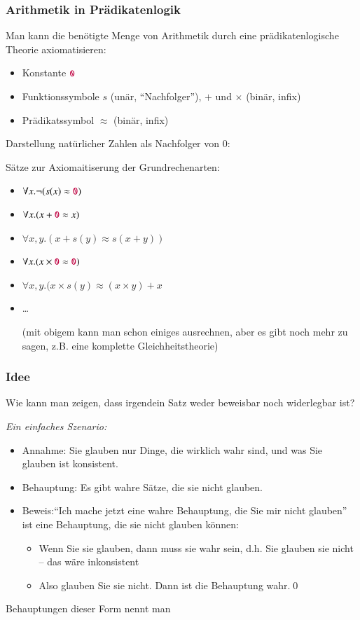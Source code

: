 \documentclass[onlymath]{beamer}
\begin{document}
\begin{frame}\frametitle{Arithmetik in Prädikatenlogik}

Man kann die benötigte Menge von Arithmetik durch eine prädikatenlogische Theorie axiomatisieren:
\begin{itemize}
\item Konstante $\mathtt{\textcolor{purple}{0}}$
\item Funktionssymbole $s$ (unär, "`Nachfolger"'), $+$ und $\times$ (binär, infix)
\item Prädikatssymbol $\approx$ (binär, infix)
\end{itemize}

Darstellung natürlicher Zahlen als Nachfolger von 0:\\[0.5ex]
\bigskip

Sätze zur Axiomaitiserung der Grundrechenarten:
\begin{itemize}
\item $\forall x.\neg(s(x)\approx \mathtt{\textcolor{purple}{0}})$
\item $\forall x.(x+\mathtt{\textcolor{purple}{0}}\approx x)$ 
\item $\forall x,y.(x+s(y)\approx s(x+y))$
\item $\forall x.(x\times \mathtt{\textcolor{purple}{0}}\approx \mathtt{\textcolor{purple}{0}})$ 
\item $\forall x,y.(x\times s(y)\approx (x\times y)+x$
\item \ldots {\tiny (mit obigem kann man schon einiges ausrechnen, aber es gibt noch mehr zu sagen, z.B. eine komplette Gleichheitstheorie)

}
\end{itemize}

\end{frame}


\begin{frame}\frametitle{Idee}

Wie kann man zeigen, dass irgendein Satz weder beweisbar noch widerlegbar ist?
\bigskip\pause

\emph{Ein einfaches Szenario:}
\begin{itemize}
\item \alert{Annahme:} Sie glauben nur Dinge, die wirklich wahr sind, und was Sie glauben ist konsistent.\pause
\item \alert{Behauptung:} Es gibt wahre Sätze, die sie nicht glauben.\pause
\item \alert{Beweis:}\pause "`Ich mache jetzt eine wahre Behauptung, die Sie mir nicht glauben"'\pause{} ist eine Behauptung, die sie nicht glauben können:
\begin{itemize}
\item Wenn Sie sie glauben, dann muss sie wahr sein, d.h. Sie glauben sie nicht -- das wäre inkonsistent
\item Also glauben Sie sie nicht. Dann ist die Behauptung wahr.\qed
\end{itemize}
\end{itemize}

Behauptungen dieser Form nennt man 

\end{frame}
\end{document}
